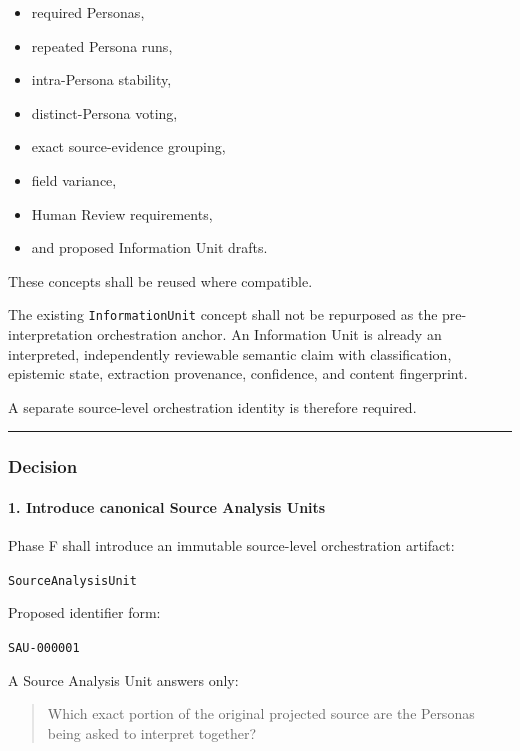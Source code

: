 \begin{itemize}
\tightlist
\item
  required Personas,
\item
  repeated Persona runs,
\item
  intra-Persona stability,
\item
  distinct-Persona voting,
\item
  exact source-evidence grouping,
\item
  field variance,
\item
  Human Review requirements,
\item
  and proposed Information Unit drafts.
\end{itemize}

These concepts shall be reused where compatible.

The existing \texttt{InformationUnit} concept shall not be repurposed as the pre-interpretation orchestration anchor. An Information Unit is already an interpreted, independently reviewable semantic claim with classification, epistemic state, extraction provenance, confidence, and content fingerprint.

A separate source-level orchestration identity is therefore required.

\begin{center}\rule{0.5\linewidth}{0.5pt}\end{center}

\hypertarget{decision-11}{%
\subsubsection{Decision}\label{decision-11}}

\hypertarget{1-introduce-canonical-source-analysis-units}{%
\paragraph{1. Introduce canonical Source Analysis Units}\label{1-introduce-canonical-source-analysis-units}}

Phase F shall introduce an immutable source-level orchestration artifact:

\texttt{SourceAnalysisUnit}

Proposed identifier form:

\texttt{SAU-000001}

A Source Analysis Unit answers only:

\begin{quote}
Which exact portion of the original projected source are the Personas being asked to interpret together?
\end{quote}

